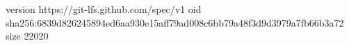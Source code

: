 version https://git-lfs.github.com/spec/v1
oid sha256:6839d826245894ed6aa930e15aff79ad008c6bb79a48f3d9d3979a7fb66b3a72
size 22020

